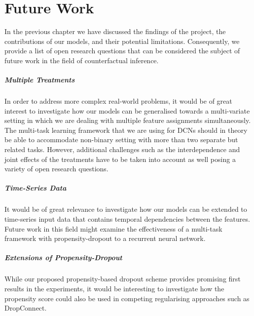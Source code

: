 %

\chapter{\label{ch:8-future-work}Future Work} 
In the previous chapter we have discussed the findings of the project, the contributions of our models, and their potential limitations. Consequently, we provide a list of open research questions that can be considered the subject of future work in the field of counterfactual inference. 

\paragraph{Multiple Treatments} In order to address more complex real-world problems, it would be of great interest to investigate how our models can be generalised towards a multi-variate setting in which we are dealing with multiple feature assignments simultaneously. The multi-task learning framework that we are using for DCNs should in theory be able to accommodate non-binary setting with more than two separate but related tasks. However, additional challenges such as the interdependence and joint effects of the treatments have to be taken into account as well posing a variety of open research questions. 

\paragraph{Time-Series Data} It would be of great relevance to investigate how our models can be extended to time-series input data that contains temporal dependencies between the features. Future work in this field might examine the effectiveness of a multi-task framework with propensity-dropout to a recurrent neural network. 

\paragraph{Extensions of Propensity-Dropout} While our proposed propensity-based dropout scheme provides promising first results in the experiments, it would be interesting to investigate how the propensity score could also be used in competing regularising approaches such as DropConnect. %

